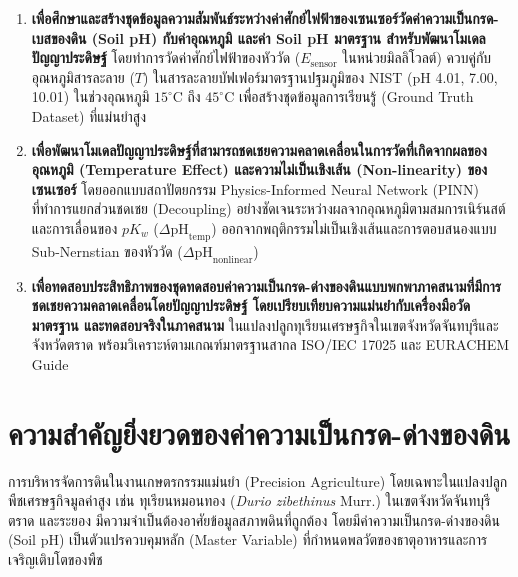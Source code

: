 \begin{tcolorbox}[
    enhanced, breakable,
    colback=rbruNavy!5, colframe=rbruNavy,
    fonttitle=\bfseries\color{white},
    title={วัตถุประสงค์การวิจัย (Research Objectives)},
    arc=2.0mm, boxrule=1.0pt, leftrule=5.0mm
]
\begin{enumerate}
    \item \textbf{เพื่อศึกษาและสร้างชุดข้อมูลความสัมพันธ์ระหว่างค่าศักย์ไฟฟ้าของเซนเซอร์วัดค่าความเป็นกรด-เบสของดิน (Soil pH) กับค่าอุณหภูมิ และค่า Soil pH มาตรฐาน สำหรับพัฒนาโมเดลปัญญาประดิษฐ์} โดยทำการวัดค่าศักย์ไฟฟ้าของหัววัด ($E_{\text{sensor}}$ ในหน่วยมิลลิโวลต์) ควบคู่กับอุณหภูมิสารละลาย ($T$) ในสารละลายบัฟเฟอร์มาตรฐานปฐมภูมิของ NIST (pH 4.01, 7.00, 10.01) ในช่วงอุณหภูมิ $15^\circ\text{C}$ ถึง $45^\circ\text{C}$ เพื่อสร้างชุดข้อมูลการเรียนรู้ (Ground Truth Dataset) ที่แม่นยำสูง
    \item \textbf{เพื่อพัฒนาโมเดลปัญญาประดิษฐ์ที่สามารถชดเชยความคลาดเคลื่อนในการวัดที่เกิดจากผลของอุณหภูมิ (Temperature Effect) และความไม่เป็นเชิงเส้น (Non-linearity) ของเซนเซอร์} โดยออกแบบสถาปัตยกรรม Physics-Informed Neural Network (PINN) ที่ทำการแยกส่วนชดเชย (Decoupling) อย่างชัดเจนระหว่างผลจากอุณหภูมิตามสมการเนิร์นสต์และการเลื่อนของ $pK_w$ ($\Delta\text{pH}_{\text{temp}}$) ออกจากพฤติกรรมไม่เป็นเชิงเส้นและการตอบสนองแบบ Sub-Nernstian ของหัววัด ($\Delta\text{pH}_{\text{nonlinear}}$)
    \item \textbf{เพื่อทดสอบประสิทธิภาพของชุดทดสอบค่าความเป็นกรด-ด่างของดินแบบพกพาภาคสนามที่มีการชดเชยความคลาดเคลื่อนโดยปัญญาประดิษฐ์ โดยเปรียบเทียบความแม่นยำกับเครื่องมือวัดมาตรฐาน และทดสอบจริงในภาคสนาม} ในแปลงปลูกทุเรียนเศรษฐกิจในเขตจังหวัดจันทบุรีและจังหวัดตราด พร้อมวิเคราะห์ตามเกณฑ์มาตรฐานสากล ISO/IEC 17025 และ EURACHEM Guide
\end{enumerate}
\end{tcolorbox}

\section{ความสำคัญยิ่งยวดของค่าความเป็นกรด-ด่างของดิน}

การบริหารจัดการดินในงานเกษตรกรรมแม่นยำ (Precision Agriculture) โดยเฉพาะในแปลงปลูกพืชเศรษฐกิจมูลค่าสูง เช่น ทุเรียนหมอนทอง (\textit{Durio zibethinus} Murr.) ในเขตจังหวัดจันทบุรี ตราด และระยอง มีความจำเป็นต้องอาศัยข้อมูลสภาพดินที่ถูกต้อง โดยมีค่าความเป็นกรด-ด่างของดิน (Soil pH) เป็นตัวแปรควบคุมหลัก (Master Variable) ที่กำหนดพลวัตของธาตุอาหารและการเจริญเติบโตของพืช

